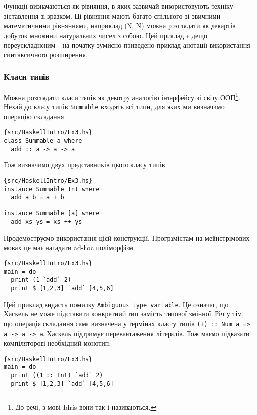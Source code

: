 \documentclass[12pt]{article}
\begin{document}
Функції визначаються як рівняння, в яких зазвичай використовують техніку зіставлення зі зразком. Ці рівняння мають багато спільного зі звичними математичними рівняннями, наприклад (N, N) можна розглядати як декартів добуток множини натуральних чисел з собою. Цей приклад є дещо переускладненим - на початку зумисно приведено приклад анотації використання синтаксичного розширення.\\

\subsubsection*{Класи типів}

Можна розглядати класи типів як декотру аналогію інтерфейсу зі світу ООП\footnote{До речі, в мові Idris вони так і називаються.}. Нехай до класу типів \lstinline{Summable} входять всі типи, для яких ми визначимо операцію складання.\\

\begin{lstlisting}{src/HaskellIntro/Ex3.hs}
class Summable a where
  add :: a -> a -> a
\end{lstlisting}

Тож визначимо двух представників цього класу типів.\\

\begin{lstlisting}{src/HaskellIntro/Ex3.hs}
instance Summable Int where
  add a b = a + b

instance Summable [a] where
  add xs ys = xs ++ ys
\end{lstlisting}

Продемоструємо використання цієй конструкції. Програмістам на мейнстрімових мовах це має нагадати ad-hoc поліморфізм.\\

\begin{lstlisting}{src/HaskellIntro/Ex3.hs}
main = do
  print (1 `add` 2)
  print $ [1,2,3] `add` [4,5,6]
\end{lstlisting}

Цей приклад видасть помилку \lstinline{Ambiguous type variable}. Це означає, що Хаскель не може підставити конкретний тип замість типової змінної. Річ у тім, що операція складання сама визначена у термінах классу типів \lstinline{(+) :: Num a => a -> a -> a}. Хаскель підтримує перевантаження літералів. Тож маємо підказати компіляторові необхідний монотип:\\

\begin{lstlisting}{src/HaskellIntro/Ex3.hs}
main = do
  print ((1 :: Int) `add` 2)
  print $ [1,2,3] `add` [4,5,6]
\end{lstlisting}
\end{document}
